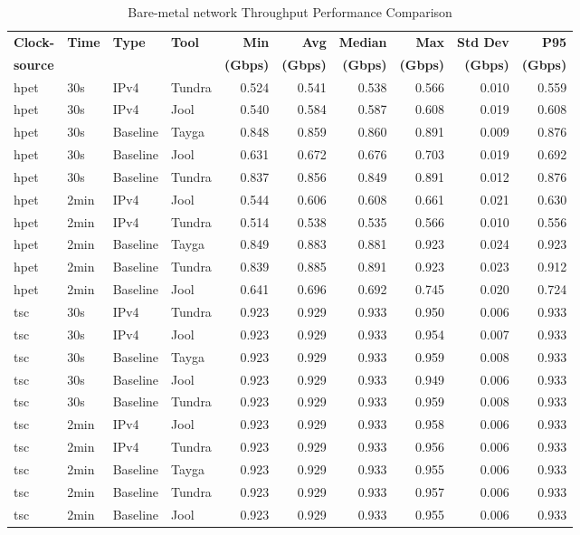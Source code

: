 \begin{table}[htbp]
\centering
\caption{Bare-metal network Throughput Performance Comparison}
\label{tab:throughput_comparison_localdouble}
\footnotesize
\begin{tabular}{|l|l|l|l|r|r|r|r|r|r|}
\hline
\textbf{Clock-} & \textbf{Time} & \textbf{Type} & \textbf{Tool} & \textbf{Min} & \textbf{Avg} & \textbf{Median} & \textbf{Max} & \textbf{Std Dev} & \textbf{P95} \\
\textbf{source} & & & & \textbf{(Gbps)} & \textbf{(Gbps)} & \textbf{(Gbps)} & \textbf{(Gbps)} & \textbf{(Gbps)} & \textbf{(Gbps)} \\
\hline
hpet & 30s & IPv4 & Tundra & 0.524 & 0.541 & 0.538 & 0.566 & 0.010 & 0.559 \\
hpet & 30s & IPv4 & Jool & 0.540 & 0.584 & 0.587 & 0.608 & 0.019 & 0.608 \\
hpet & 30s & Baseline & Tayga & 0.848 & 0.859 & 0.860 & 0.891 & 0.009 & 0.876 \\
hpet & 30s & Baseline & Jool & 0.631 & 0.672 & 0.676 & 0.703 & 0.019 & 0.692 \\
hpet & 30s & Baseline & Tundra & 0.837 & 0.856 & 0.849 & 0.891 & 0.012 & 0.876 \\
hpet & 2min & IPv4 & Jool & 0.544 & 0.606 & 0.608 & 0.661 & 0.021 & 0.630 \\
hpet & 2min & IPv4 & Tundra & 0.514 & 0.538 & 0.535 & 0.566 & 0.010 & 0.556 \\
hpet & 2min & Baseline & Tayga & 0.849 & 0.883 & 0.881 & 0.923 & 0.024 & 0.923 \\
hpet & 2min & Baseline & Tundra & 0.839 & 0.885 & 0.891 & 0.923 & 0.023 & 0.912 \\
hpet & 2min & Baseline & Jool & 0.641 & 0.696 & 0.692 & 0.745 & 0.020 & 0.724 \\
\hline
tsc & 30s & IPv4 & Tundra & 0.923 & 0.929 & 0.933 & 0.950 & 0.006 & 0.933 \\
tsc & 30s & IPv4 & Jool & 0.923 & 0.929 & 0.933 & 0.954 & 0.007 & 0.933 \\
tsc & 30s & Baseline & Tayga & 0.923 & 0.929 & 0.933 & 0.959 & 0.008 & 0.933 \\
tsc & 30s & Baseline & Jool & 0.923 & 0.929 & 0.933 & 0.949 & 0.006 & 0.933 \\
tsc & 30s & Baseline & Tundra & 0.923 & 0.929 & 0.933 & 0.959 & 0.008 & 0.933 \\
tsc & 2min & IPv4 & Jool & 0.923 & 0.929 & 0.933 & 0.958 & 0.006 & 0.933 \\
tsc & 2min & IPv4 & Tundra & 0.923 & 0.929 & 0.933 & 0.956 & 0.006 & 0.933 \\
tsc & 2min & Baseline & Tayga & 0.923 & 0.929 & 0.933 & 0.955 & 0.006 & 0.933 \\
tsc & 2min & Baseline & Tundra & 0.923 & 0.929 & 0.933 & 0.957 & 0.006 & 0.933 \\
tsc & 2min & Baseline & Jool & 0.923 & 0.929 & 0.933 & 0.955 & 0.006 & 0.933 \\
\hline
\end{tabular}
\end{table}

